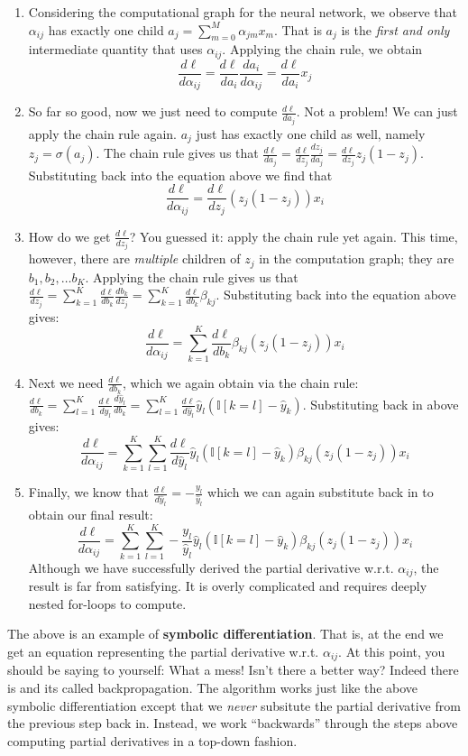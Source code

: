 \documentclass[11pt]{article}
\numberwithin{equation}{section} %
\numberwithin{figure}{section} %
\numberwithin{table}{section} %
\newcommand{\adj}[1]{\frac{d \ell}{d #1}}
\newcommand{\chain}[2]{\adj{#2} = \adj{#1}\frac{d #1}{d #2}}
\newcommand{\Ib}{\mathbb{I}}
\begin{document}
\begin{enumerate}
    \item Considering the computational graph for the neural network, we observe that $\alpha_{ij}$ has exactly one child $a_j = \sum_{m=0}^M \alpha_{jm} x_m$. That is $a_j$ is the \emph{first and only} intermediate quantity that uses $\alpha_{ij}$. Applying the chain rule, we obtain 
        \[ \chain{a_i}{\alpha_{ij}} = \adj{a_i} x_j \] 
    \item So far so good, now we just need to compute $\adj{a_j}$. Not a problem! We can just apply the chain rule again. $a_j$ just has exactly one child as well, namely $z_j = \sigma(a_j)$. The chain rule gives us that $\chain{z_j}{a_j} = \adj{z_j} z_j (1 - z_j)$. Substituting back into the equation above we find that 
        \[ \adj{\alpha_{ij}} = \adj{z_j} (z_j (1-z_j)) x_i \]
    \item How do we get $\adj{z_j}$? You guessed it: apply the chain rule yet again. This time, however, there are \emph{multiple} children of $z_j$ in the computation graph; they are $b_1, b_2, \ldots b_K$. Applying the chain rule gives us that $\adj{z_j} = \sum_{k=1}^K \adj{b_k}\frac{d b_k}{d z_j} = \sum_{k=1}^K \adj{b_k}\beta_{kj}$. Substituting back into the equation above gives:
        \[ \adj{\alpha_{ij}} = \sum_{k=1}^K \adj{b_k}\beta_{kj} (z_j (1-z_j)) x_i \]
    \item Next we need $\adj{b_k}$, which we again obtain via the chain rule: $\adj{b_k} = \sum_{l=1}^K \adj{\hat{y}_l} \frac{d \hat{y}_l}{d b_k} = \sum_{l=1}^K \adj{\hat{y}_l} \hat{y}_l (\Ib[k=l] - \hat{y}_k)$. Substituting back in above gives:
        \[ \adj{\alpha_{ij}} = \sum_{k=1}^K \sum_{l=1}^K \adj{\hat{y}_l} \hat{y}_l (\Ib[k=l] - \hat{y}_k) \beta_{kj} (z_j (1-z_j)) x_i \]
    \item Finally, we know that $\adj{\hat{y}_l} = - \frac{y_l}{\hat{y}_l}$ which we can again substitute back in to obtain our final result:
        \[ \adj{\alpha_{ij}} = \sum_{k=1}^K \sum_{l=1}^K - \frac{y_l}{\hat{y}_l} \hat{y}_l (\Ib[k=l] - \hat{y}_k) \beta_{kj} (z_j (1-z_j)) x_i \]
    Although we have successfully derived the partial derivative w.r.t. $\alpha_{ij}$, the result is far from satisfying. It is overly complicated and requires deeply nested for-loops to compute.
\end{enumerate}

The above is an example of {\bf symbolic differentiation}. That is, at the end we get an equation representing the partial derivative w.r.t. $\alpha_{ij}$. At this point, you should be saying to yourself: What a mess! Isn't there a better way? Indeed there is and its called backpropagation. The algorithm works just like the above symbolic differentiation except that we \textit{never} subsitute the partial derivative from the previous step back in. Instead, we work ``backwards'' through the steps above computing partial derivatives in a top-down fashion. 
\end{document}
